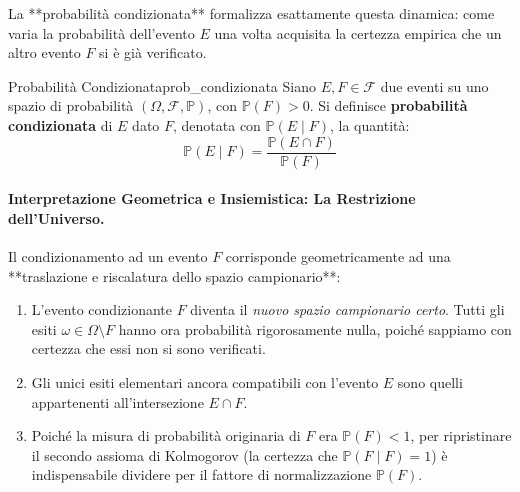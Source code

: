 La **probabilità condizionata** formalizza esattamente questa dinamica: come varia la probabilità dell'evento $E$ una volta acquisita la certezza empirica che un altro evento $F$ si è già verificato.

\begin{definizione}{Probabilità Condizionata}{prob_condizionata}
Siano $E, F \in \mathcal{F}$ due eventi su uno spazio di probabilità $(\Omega, \mathcal{F}, \mathbb{P})$, con $\mathbb{P}(F) > 0$. Si definisce \textbf{probabilità condizionata} di $E$ dato $F$, denotata con $\mathbb{P}(E \mid F)$, la quantità:
\begin{equation}
    \mathbb{P}(E \mid F) = \frac{\mathbb{P}(E \cap F)}{\mathbb{P}(F)}
\end{equation}
\end{definizione}

\paragraph{Interpretazione Geometrica e Insiemistica: La Restrizione dell'Universo.}
Il condizionamento ad un evento $F$ corrisponde geometricamente ad una **traslazione e riscalatura dello spazio campionario**:
\begin{enumerate}
    \item L'evento condizionante $F$ diventa il \emph{nuovo spazio campionario certo}. Tutti gli esiti $\omega \in \Omega \setminus F$ hanno ora probabilità rigorosamente nulla, poiché sappiamo con certezza che essi non si sono verificati.
    \item Gli unici esiti elementari ancora compatibili con l'evento $E$ sono quelli appartenenti all'intersezione $E \cap F$.
    \item Poiché la misura di probabilità originaria di $F$ era $\mathbb{P}(F) < 1$, per ripristinare il secondo assioma di Kolmogorov (la certezza che $\mathbb{P}(F \mid F) = 1$) è indispensabile dividere per il fattore di normalizzazione $\mathbb{P}(F)$.
\end{enumerate}

